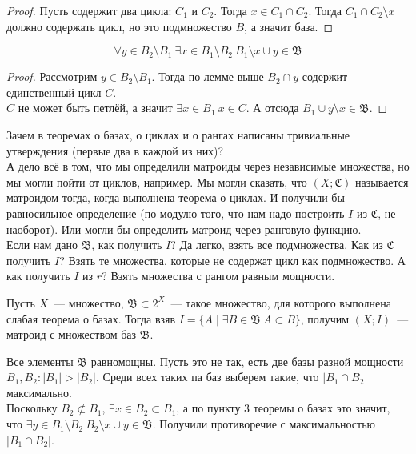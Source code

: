 \documentclass{article}
\begin{document}
    \begin{proof}
        Пусть содержит два цикла: $C_1$ и $C_2$. Тогда $x\in C_1\cap C_2$. Тогда $C_1\cap C_2\setminus x$ должно содержать цикл, но это подмножество $B$, а значит база.
    \end{proof}
    \begin{theorem}
        $$
        \forall y\in B_2\setminus B_1~\exists x\in B_1\setminus B_2~B_1\setminus x\cup y\in\mathfrak B
        $$
    \end{theorem}
    \begin{proof}
        Рассмотрим $y\in B_2\setminus B_1$. Тогда по лемме выше $B_2\cap y$ содержит единственный цикл $C$.\\
        $C$ не может быть петлёй, а значит $\exists x\in B_1~x\in C$. А отсюда $B_1\cup y\setminus x\in\mathfrak B$.
    \end{proof}
    \begin{remark}
        Зачем в теоремах о базах, о циклах и о рангах написаны тривиальные утверждения (первые два в каждой из них)?\\
        А дело всё в том, что мы определили матроиды через независимые множества, но мы могли пойти от циклов, например. Мы могли сказать, что $(X;\mathfrak C)$ называется матроидом тогда, когда выполнена теорема о циклах. И получили бы равносильное определение (по модулю того, что нам надо построить $I$ из $\mathfrak C$, не наоборот). Или могли бы определить матроид через ранговую функцию.\\
        Если нам дано $\mathfrak B$, как получить $I$? Да легко, взять все подмножества. Как из $\mathfrak C$ получить $I$? Взять те множества, которые не содержат цикл как подмножество. А как получить $I$ из $r$? Взять множества с рангом равным мощности.
    \end{remark}
    \begin{theorem}
        Пусть $X$~--- множество, $\mathfrak B\subset 2^X$~--- такое множество, для которого выполнена слабая теорема о базах. Тогда взяв $I=\{A\mid\exists B\in\mathfrak B~A\subset B\}$, получим $(X;I)$~--- матроид с множеством баз $\mathfrak B$.
    \end{theorem}
    \begin{lemma}
        Все элементы $\mathfrak B$ равномощны. Пусть это не так, есть две базы разной мощности $B_1,B_2:|B_1|>|B_2|$. Среди всех таких па баз выберем такие, что $|B_1\cap B_2|$ максимально.\\
        Поскольку $B_2\not\subset B_1$, $\exists x\in B_2\subset B_1$, а по пункту 3 теоремы о базах это значит, что $\exists y\in B_1\setminus B_2~B_2\setminus x\cup y\in\mathfrak B$. Получили противоречие с максимальностью $|B_1\cap B_2|$.
    \end{lemma}
\end{document}
